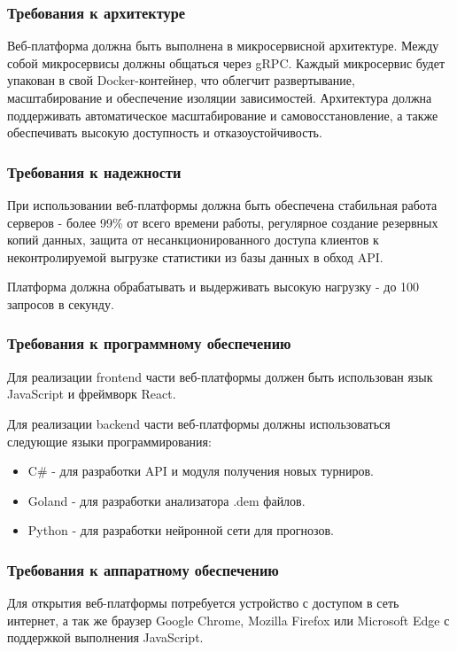\subsubsection{Требования к архитектуре}
Веб-платформа должна быть выполнена в микросервисной архитектуре. Между собой микросервисы должны общаться через gRPC. Каждый микросервис будет упакован в свой Docker-контейнер, что облегчит развертывание, масштабирование и обеспечение изоляции зависимостей. Архитектура должна поддерживать автоматическое масштабирование и самовосстановление, а также обеспечивать высокую доступность и отказоустойчивость.

\subsubsection{Требования к надежности}

При использовании веб-платформы должна быть обеспечена стабильная работа серверов - более 99\% от всего времени работы, регулярное создание резервных копий данных, защита от несанкционированного доступа клиентов к неконтролируемой выгрузке статистики из базы данных в обход API.

Платформа должна обрабатывать и выдерживать высокую нагрузку - до 100 запросов в секунду.

\subsubsection{Требования к программному обеспечению}

Для реализации frontend части веб-платформы должен быть использован язык JavaScript и фреймворк React. 

Для реализации backend части веб-платформы должны использоваться следующие языки программирования: 
\begin{itemize}
	\item C\# - для разработки API и модуля получения новых турниров.
	\item Goland - для разработки анализатора .dem файлов.
	\item Python - для разработки нейронной сети для прогнозов.
\end{itemize}

\subsubsection{Требования к аппаратному обеспечению}

Для открытия веб-платформы потребуется устройство с доступом в сеть интернет, а так же браузер Google Chrome, Mozilla Firefox или Microsoft Edge с поддержкой выполнения JavaScript.

